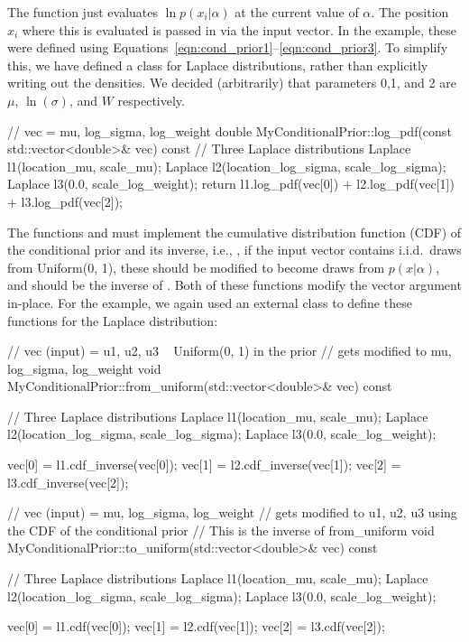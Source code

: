 \documentclass[article]{jss}
\begin{document}
The  function just evaluates $\ln p(x_i | \alpha)$
at the current value of $\alpha$. The position $x_i$ where this is evaluated
is passed in via the input vector. In the example, these
were defined using Equations~\ref{eqn:cond_prior1}--\ref{eqn:cond_prior3}.
To simplify this, we have defined a class for Laplace distributions,
rather than explicitly writing out the densities. We decided (arbitrarily)
that parameters 0,1, and 2 are $\mu$, $\ln(\sigma)$, and $W$ respectively.
%
\begin{CodeChunk}
\begin{CodeInput}
// vec = {mu, log_sigma, log_weight}
double MyConditionalPrior::log_pdf(const std::vector<double>& vec) const
{
    // Three Laplace distributions
    Laplace l1(location_mu, scale_mu);
    Laplace l2(location_log_sigma, scale_log_sigma);
    Laplace l3(0.0, scale_log_weight);
    return l1.log_pdf(vec[0]) + l2.log_pdf(vec[1]) + l3.log_pdf(vec[2]);
}
\end{CodeInput}
\end{CodeChunk}
%
The functions  and  must implement
the cumulative distribution function (CDF) of the conditional
prior and its inverse, i.e., , if the input vector contains
i.i.d.~draws from Uniform(0, 1), these should be modified to become draws from
$p(x|\alpha)$, and  should be the inverse of
.
Both of these functions modify the vector argument in-place.
For the example, we again used an external class to define these functions
for the Laplace distribution:
%
\begin{CodeChunk}
\begin{CodeInput}
// vec (input) = {u1, u2, u3} ~ Uniform(0, 1) in the prior
// gets modified to {mu, log_sigma, log_weight}
void MyConditionalPrior::from_uniform(std::vector<double>& vec) const
{
    // Three Laplace distributions
    Laplace l1(location_mu, scale_mu);
    Laplace l2(location_log_sigma, scale_log_sigma);
    Laplace l3(0.0, scale_log_weight);

    vec[0] = l1.cdf_inverse(vec[0]);
    vec[1] = l2.cdf_inverse(vec[1]);
    vec[2] = l3.cdf_inverse(vec[2]);
}

// vec (input) = {mu, log_sigma, log_weight}
// gets modified to {u1, u2, u3} using the CDF of the conditional prior
// This is the inverse of from_uniform
void MyConditionalPrior::to_uniform(std::vector<double>& vec) const
{
    // Three Laplace distributions
    Laplace l1(location_mu, scale_mu);
    Laplace l2(location_log_sigma, scale_log_sigma);
    Laplace l3(0.0, scale_log_weight);

    vec[0] = l1.cdf(vec[0]);
    vec[1] = l2.cdf(vec[1]);
    vec[2] = l3.cdf(vec[2]);
}
\end{CodeInput}
\end{CodeChunk}
%
\end{document}
